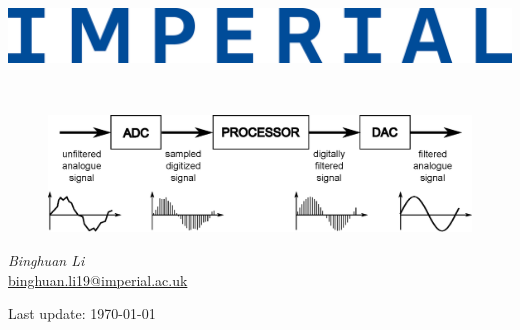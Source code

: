 \begin{titlepage}
\Large

\begin{minipage}{0.4\textwidth}
    \includegraphics[width=\textwidth]{images/Imperial.eps}
\end{minipage}

\vspace{1.5cm}

\begin{center}
        \vspace{2cm}
        {\Huge \textbf{\textit{\doc}}}\\
        \vspace{2cm}
        \begin{figure}[H]
            \centering
            \includegraphics[width=\textwidth]{images/DSP.eps}
        \end{figure}
        \vspace{2cm}
        \textit{Binghuan Li}\\
        \href{mailto:binghuan.li19@imperial.ac.uk}{binghuan.li19@imperial.ac.uk}

        \vspace{3cm}
        Last update: \today
        \vfill
\end{center}

\end{titlepage}